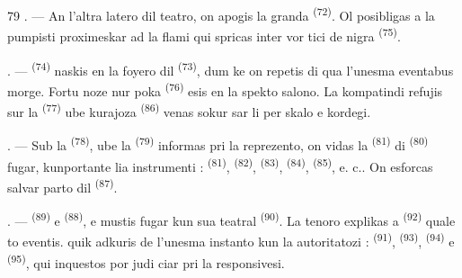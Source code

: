 \begin{VUpage}[81]{79}
. --- An l'altra latero dil teatro, on apogis\nl
la granda  \textsuperscript{(72)}. Ol posibligas a la pumpisti\nl
proximeskar ad la flami qui spricas inter vor\cc
tici de nigra  \textsuperscript{(75)}.

\VUsaut{5.0mm}
\VUsaut{3.4mm}

. ---  \textsuperscript{(74)} naskis en la foyero dil\nl
{} \textsuperscript{(73)}, dum ke on repetis  di qua\nl
l'unesma  eventabus morge. Fortu\cc
noze nur poka  \textsuperscript{(76)} esis en la spekto\cc
salono. La kompatindi refujis sur la \cc
{} \textsuperscript{(77)} ube kurajoza  \textsuperscript{(86)} venas sokur\cc
sar li per skalo e kordegi.

. --- Sub la  \textsuperscript{(78)}, ube la  \textsuperscript{(79)}\nl
informas pri la reprezento, on vidas la \cc
{} \textsuperscript{(81)} di  \textsuperscript{(80)} fugar, kunportante\nl
lia instrumenti :  \textsuperscript{(81)},  \textsuperscript{(82)}, \cc
{} \textsuperscript{(83)},  \textsuperscript{(84)},  \textsuperscript{(85)}, e. c.. On\nl
esforcas salvar parto dil  \textsuperscript{(87)}.

. ---  \textsuperscript{(89)} e  \textsuperscript{(88)}, \cc
{} e  mustis fugar kun sua teatral\nl
{} \textsuperscript{(90)}. La tenoro explikas a  \textsuperscript{(92)}\nl
quale to eventis.  quik adkuris de\nl
l'unesma instanto kun la autoritatozi : \cc
{} \textsuperscript{(91)},  \textsuperscript{(93)},  \textsuperscript{(94)}\nl
e  \textsuperscript{(95)}, qui inquestos por judi\cc
ciar pri la responsivesi.

\VUsaut{6.0mm}
\VUfilet{22mm}
\end{VUpage}
